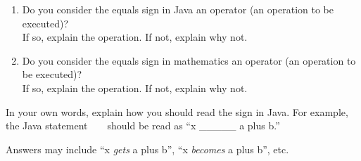 \begin{enumerate}

\item Do you consider the equals sign in Java an operator (an operation to be executed)?
\\ If so, explain the operation. If not, explain why not.


\item Do you consider the equals sign in mathematics an operator (an operation to be executed)?
\\ If so, explain the operation. If not, explain why not.


\end{enumerate}


\Q In your own words, explain how you should read the \java{=} sign in Java.
For example, the Java statement ~  ~ should be read as ``x \_\_\_\_\_ a plus b.''

\begin{answer}
Answers may include ``x \emph{gets} a plus b'', ``x \emph{becomes} a plus b'', etc.
\end{answer}
